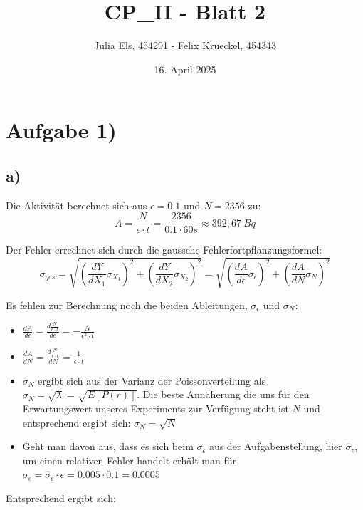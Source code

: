 \documentclass{article}
\title{CP\_II - Blatt 2}
\author{Julia Els, 454291 - Felix Krueckel, 454343}
\date{16. April 2025}
\begin{document}
    \maketitle

    \section*{Aufgabe 1)}
    \subsection*{a)}

    Die Aktivität berechnet sich aus \( \epsilon = 0.1 \) und \( N = 2356 \) zu: \[ A = \frac{N}{\epsilon \cdot t} = \frac{2356}{0.1 \cdot 60s} \approx 392,67 \ Bq\]

    Der Fehler errechnet sich durch die gaussche  Fehlerfortpflanzungsformel: \[ \sigma_{ges} = \sqrt{\left( \frac{d Y}{d X_1} \sigma_{X_1} \right)^2 + \left( \frac{d Y}{d X_2} \sigma_{X_2} \right)^2} = \sqrt{\left( \frac{d A}{d \epsilon} \sigma_\epsilon \right)^2 + \left( \frac{d A}{d N} \sigma_N \right)^2} \]

    Es fehlen zur Berechnung noch die beiden Ableitungen, \( \sigma_\epsilon \) und \( \sigma_N \):

    \begin{itemize}
        \item \( \frac{d A}{d \epsilon} = \frac{d \frac{N}{\epsilon \cdot t}}{d \epsilon} = -\frac{N}{\epsilon^2 \cdot t}\)
        \item \( \frac{d A}{d N} = \frac{d \frac{N}{\epsilon \cdot t}}{d N} = \frac{1}{\epsilon \cdot t} \)
        \item \( \sigma_N \) ergibt sich aus der Varianz der Poissonverteilung als \( \sigma_N = \sqrt{\lambda} \allowbreak = \sqrt{E[P(r)]} \allowbreak \). Die beste Annäherung die uns für den Erwartungswert unseres Experiments zur Verfügung steht ist \( N \) und entsprechend ergibt sich: \( \sigma_N = \sqrt{N} \) \\
        \item Geht man davon aus, dass es sich beim \( \sigma_\epsilon \) aus der Aufgabenstellung, hier \( \hat{\sigma}_\epsilon \), um einen relativen Fehler handelt erhält man für \( \sigma_\epsilon = \hat{\sigma}_\epsilon \cdot \epsilon \allowbreak = 0.005 \cdot 0.1 = 0.0005 \)
    \end{itemize}

    Entsprechend ergibt sich:\\
\end{document}
